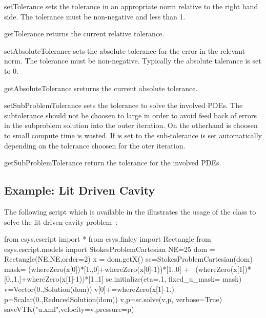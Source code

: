 \begin{methoddesc}[StokesProblemCartesian]{setTolerance}{}
sets the tolerance in an appropriate norm relative to the right hand side. The tolerance must be non-negative and less than 1.
\end{methoddesc}
\begin{methoddesc}[StokesProblemCartesian]{getTolerance}{}
returns the current relative tolerance.
\end{methoddesc}
\begin{methoddesc}[StokesProblemCartesian]{setAbsoluteTolerance}{}
sets the absolute tolerance for the error in the relevant norm. The tolerance must be non-negative. Typically the
absolute talerance is set to 0.
\end{methoddesc}
\begin{methoddesc}[StokesProblemCartesian]{getAbsoluteTolerance}{}
sreturns the current absolute tolerance.
\end{methoddesc}
\begin{methoddesc}[StokesProblemCartesian]{setSubProblemTolerance}{}
sets the tolerance to solve the involved PDEs. The subtolerance  should not be choosen to large 
in order to avoid feed back of errors in the subproblem solution into the outer iteration.
On the otherhand is choosen to small compute time is wasted.
If  is set to  the sub-tolerance is set automatically depending on the 
tolerance choosen for the oter iteration.
\end{methoddesc}
\begin{methoddesc}[StokesProblemCartesian]{getSubProblemTolerance}{}
return the tolerance for the involved PDEs.
\end{methoddesc}

\subsection{Example: Lit Driven Cavity}
 The following script  
 which is available in the \ExampleDirectory
illustrates the usage of the  class to solve
the lit driven cavity problem~\cite{LITDRIVENCAVITY}:
\begin{python}
from esys.escript import *
from esys.finley import Rectangle
from esys.escript.models import StokesProblemCartesian
NE=25
dom = Rectangle(NE,NE,order=2)
x = dom.getX()
sc=StokesProblemCartesian(dom)
mask= (whereZero(x[0])*[1.,0]+whereZero(x[0]-1))*[1.,0] + \
      (whereZero(x[1])*[0.,1.]+whereZero(x[1]-1))*[1.,1]
sc.initialize(eta=.1, fixed_u_mask= mask)
v=Vector(0.,Solution(dom))
v[0]+=whereZero(x[1]-1.)
p=Scalar(0.,ReducedSolution(dom))
v,p=sc.solve(v,p, verbose=True)
saveVTK("u.xml",velocity=v,pressure=p)
\end{python}

